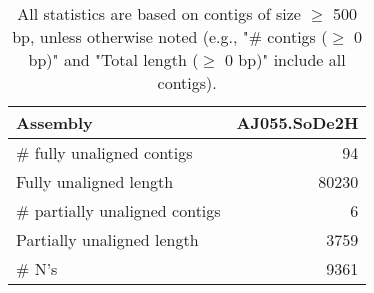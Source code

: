 \documentclass[12pt,a4paper]{article}
\begin{document}
\begin{table}[ht]
\begin{center}
\caption{All statistics are based on contigs of size $\geq$ 500 bp, unless otherwise noted (e.g., "\# contigs ($\geq$ 0 bp)" and "Total length ($\geq$ 0 bp)" include all contigs).}
\begin{tabular}{|l*{1}{|r}|}
\hline
Assembly & AJ055.SoDe2H \\ \hline
\# fully unaligned contigs & 94 \\ \hline
Fully unaligned length & 80230 \\ \hline
\# partially unaligned contigs & 6 \\ \hline
Partially unaligned length & 3759 \\ \hline
\# N's & 9361 \\ \hline
\end{tabular}
\end{center}
\end{table}
\end{document}
